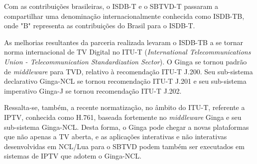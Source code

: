 Com as contribuições brasileiras, o ISDB-T e o SBTVD-T passaram a compartilhar uma denominação internacionalmente
conhecida como ISDB-TB, onde "B" representa as contribuições do Brasil para o ISDB-T\cite{isdb-tb}.

As melhorias resultantes da parceria realizada levaram o ISDB-TB a se tornar norma internacional de TV Digital no ITU-T (\textit{International Telecommunications Union - Telecommunication Standardization Sector})\cite{info-gingancl-h761}\cite{idgnow-ginga-padrao-itu}.
O Ginga se tornou padrão de \textit{middleware} para TVD, relativo à recomendação ITU-T J.200\cite{ginga-itu-j200}.
Seu sub-sistema declarativo Ginga-NCL se tornou recomendação ITU-T J.201\cite{gingancl-itu-j201}
e seu sub-sistema imperativo Ginga-J se tornou recomendação ITU-T J.202\cite{gingaj-itu-j202}.

Ressalta-se, também, a recente normatização, no âmbito do ITU-T, referente a IPTV, conhecida como H.761, baseada fortemente no \textit{middleware} Ginga
e seu sub-sistema Ginga-NCL. Desta forma, o Ginga pode chegar a novas plataformas que não apenas a TV aberta, e as aplicações interativas 
e não interativas desenvolvidas em NCL/Lua para o SBTVD podem também ser executados em sistemas de IPTV que adotem o Ginga-NCL.
